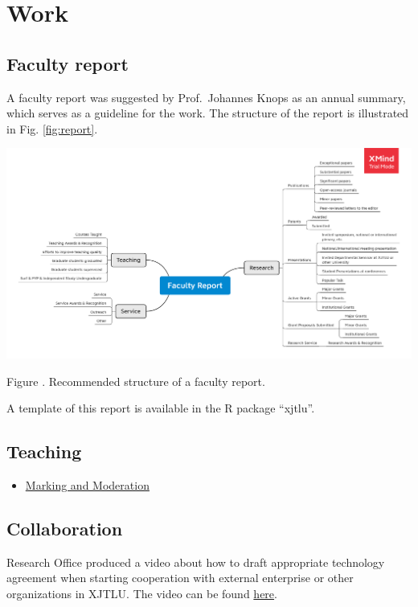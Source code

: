 \documentclass[
]{book}
\providecommand{\tightlist}{%
  \setlength{\itemsep}{0pt}\setlength{\parskip}{0pt}}
\begin{document}
\hypertarget{work}{%
\chapter{Work}\label{work}}

\hypertarget{faculty-report}{%
\section{Faculty report}\label{faculty-report}}

A faculty report was suggested by Prof.~Johannes Knops as an annual summary, which serves as a guideline for the work. The structure of the report is illustrated in Fig. \ref{fig:report}.

\includegraphics{image/faculty_report.png}

Figure \label{fig:report}. Recommended structure of a faculty report.

A template of this report is available in the R package ``xjtlu''.

\hypertarget{teaching}{%
\section{Teaching}\label{teaching}}

\begin{itemize}
\tightlist
\item
  \href{https://ice.xjtlu.edu.cn/course/view.php?id=1605\&section=1}{Marking and Moderation}
\end{itemize}

\hypertarget{collaboration}{%
\section{Collaboration}\label{collaboration}}

Research Office produced a video about how to draft appropriate technology agreement when starting cooperation with external enterprise or other organizations in XJTLU. The video can be found \href{https://box.xjtlu.edu.cn/smart-link/d0dc536d-1b5f-4a75-bcce-087a14a929ad/}{here}.
\end{document}
